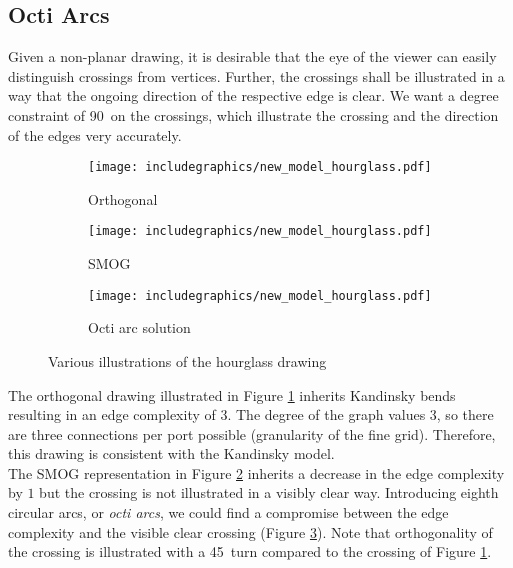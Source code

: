 \subsection{Octi Arcs}
Given a non-planar drawing, it is desirable that the eye of the viewer can easily distinguish crossings from vertices. Further, the crossings shall be illustrated in a way that the ongoing direction of the respective edge is clear. We want a degree constraint of 90\degree~on the crossings, which illustrate the crossing and the direction of the edges very accurately.
\begin{figure}[H]
	\centering
	\begin{subfigure}{0.3\textwidth}
		\centering
		\texttt{[image: includegraphics/new\_model\_hourglass.pdf]}
		\caption{Orthogonal}\label{im:new_model_orthogonal}
	\end{subfigure}
	\begin{subfigure}{0.3\textwidth}
		\centering
		\texttt{[image: includegraphics/new\_model\_hourglass.pdf]}
		\caption{SMOG}\label{im:new_model_SMOG}
	\end{subfigure}
	\begin{subfigure}{0.3\textwidth}
		\centering
		\texttt{[image: includegraphics/new\_model\_hourglass.pdf]}
		\caption{Octi arc solution}\label{im:new_model_eighth}
	\end{subfigure}
	\caption{Various illustrations of the hourglass drawing}\label{im:new_model}
\end{figure}
The orthogonal drawing illustrated in Figure \ref{im:new_model_orthogonal} inherits Kandinsky bends resulting in an edge complexity of $3$. The degree of the graph values 3, so there are three connections per port possible (granularity of the fine grid). Therefore, this drawing is consistent with the Kandinsky model.\\
The SMOG representation in Figure \ref{im:new_model_SMOG} inherits a decrease in the edge complexity by $1$ but the crossing is not illustrated in a visibly clear way. Introducing eighth circular arcs, or \textit{octi arcs}, we could find a compromise between the edge complexity and the visible clear crossing (Figure \ref{im:new_model_eighth}). Note that orthogonality of the crossing is illustrated with a 45\degree~turn compared to the crossing of Figure \ref{im:new_model_orthogonal}.
